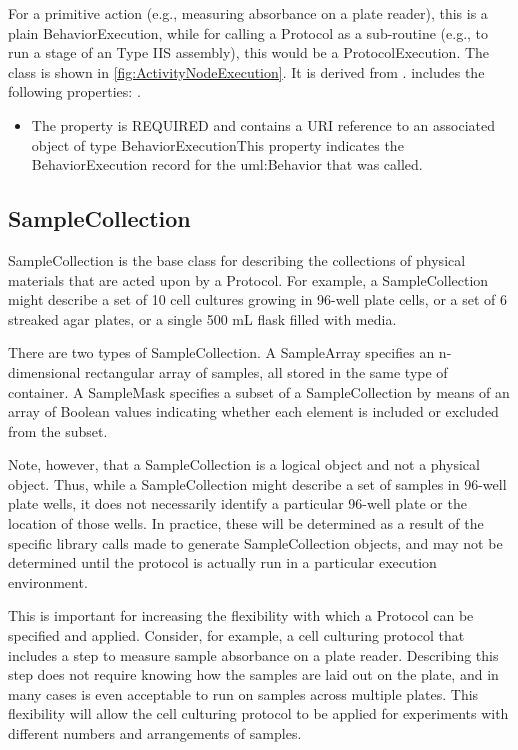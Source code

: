         For a primitive action (e.g., measuring absorbance on a plate reader), this is a plain BehaviorExecution,
        while for calling a Protocol as a sub-routine (e.g., to run a stage of an Type IIS assembly), this would be a
        ProtocolExecution.%
\linebreak%
\linebreak%
The  class is shown in \ref{fig:ActivityNodeExecution}. It is derived from .%
 includes the following properties: . %
\begin{itemize}%
\item%
The  property is REQUIRED and contains a URI reference to an associated object of type BehaviorExecutionThis property indicates the BehaviorExecution record for the uml:Behavior that was called.%
\end{itemize}%
\subsection{SampleCollection}%
\label{sec:paml:SampleCollection}%
SampleCollection is the base class for describing the collections of physical materials that are
         acted upon by a Protocol. For example, a SampleCollection might describe a set of 10 cell cultures growing in
         96-well plate cells, or a set of 6 streaked agar plates, or a single 500 mL flask filled with media.

         There are two types of SampleCollection. A SampleArray specifies an n-dimensional rectangular array of samples,
         all stored in the same type of container. A SampleMask specifies a subset of a SampleCollection by means of an
         array of Boolean values indicating whether each element is included or excluded from the subset.

         Note, however, that a SampleCollection is a logical object and not a physical object. Thus, while a
         SampleCollection might describe a set of samples in 96-well plate wells, it does not necessarily identify
         a particular 96-well plate or the location of those wells.  In practice, these will be determined as a
         result of the specific library calls made to generate SampleCollection objects, and may not be determined
         until the protocol is actually run in a particular execution environment.

         This is important for increasing the flexibility with which a Protocol can be specified and applied.
         Consider, for example, a cell culturing protocol that includes a step to measure sample absorbance on a plate
         reader. Describing this step does not require knowing how the samples are laid out on the plate, and in many
         cases is even acceptable to run on samples across multiple plates. This flexibility will allow the cell
         culturing protocol to be applied for experiments with different numbers and arrangements of samples.%
\linebreak%
\linebreak%


